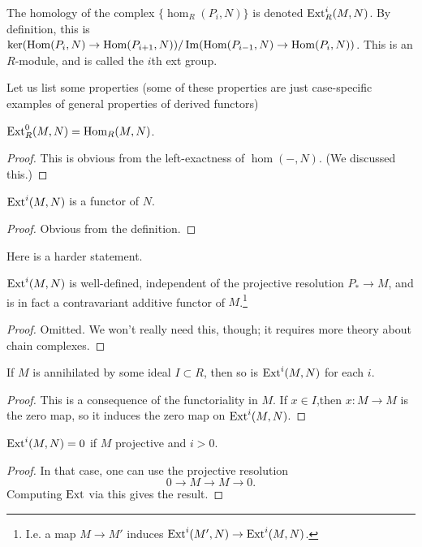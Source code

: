 \begin{definition}
The homology of the complex $\{\hom_R(P_i, N)\}$ is denoted
$\operatorname{Ext}^i_R(M,N)$. By
definition, this is $\ker(\operatorname{Hom}(P_i,N) \to \operatorname{Hom}(P_{i+1},
N))/\operatorname{Im}(\operatorname{Hom}(P_{i-1},
N) \to \operatorname{Hom}(P_i,N))$. This is an $R$-module, and is called the
$i$th ext group.
\end{definition}



Let us list some properties (some of these properties are just
case-specific examples of general properties of derived
functors)

\begin{proposition}
$\operatorname{Ext}_R^0(M,N) = \operatorname{Hom}_R(M,N)$.
\end{proposition}
\begin{proof}
This is obvious from the left-exactness of $\hom(-,N)$. (We
discussed this.)
\end{proof}

\begin{proposition}
$\operatorname{Ext}^i(M,N)$ is a functor of $N$.
\end{proposition}
\begin{proof}
Obvious from the definition.
\end{proof}

Here is a harder statement.
\begin{proposition}
$\operatorname{Ext}^i(M,N)$ is well-defined, independent of the projective
resolution $P_*
\to M$, and is in fact a contravariant additive functor of
$M$.\footnote{I.e. a map $M
\to M'$ induces $\operatorname{Ext}^i(M', N) \to \operatorname{Ext}^i(M,N)$.}
\end{proposition}
\begin{proof}
Omitted. We won't really need this, though; it requires more
theory about
chain complexes.
\end{proof}


\begin{proposition}
If $M$ is annihilated by some ideal $I \subset R$, then so is
$\operatorname{Ext}^i(M,N)$ for
each $i$.
\end{proposition}
\begin{proof}
This is a consequence of the functoriality in $M$. If $x \in
I$,then $x: M \to
M$ is the zero map, so it induces the zero map on
$\operatorname{Ext}^i(M,N)$.\end{proof}

\begin{proposition}
$\operatorname{Ext}^i(M,N) = 0$ if $M$ projective and $i>0$.
\end{proposition}
\begin{proof}
In that case, one can use the projective resolution
\[ 0 \to M \to M \to 0.  \]
Computing $\operatorname{Ext}$ via this gives the result.
\end{proof}




